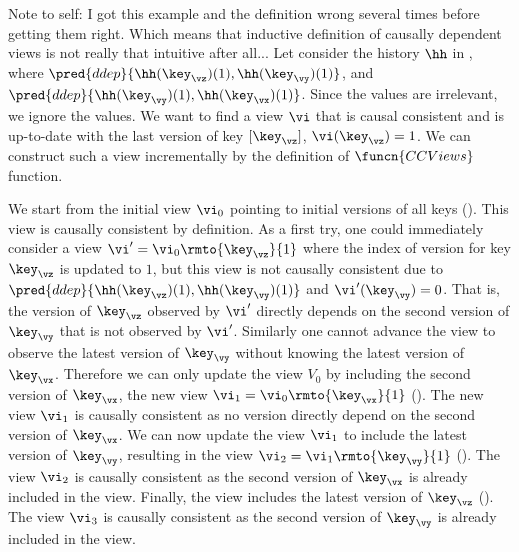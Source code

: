 \ac{Note to self: I got this example and the definition wrong several times before getting them
right. Which means that inductive definition of causally dependent views is not really that 
intuitive after all...}
Let consider the history $\hh$ in , where $\pred{ddep}{\hh(\key_\vz)(1),\hh(\key_{\vy})(1)}$, and $\pred{ddep}{\hh(\key_{\vy})(1) ,\hh(\key_{\vx})(1)}$.
Since the values are irrelevant, we ignore the values.
We want to find a view $\vi$ that is causal consistent and is up-to-date with the last version of key $[\key_{\vz}]$, \ie \( \vi(\key_\vz) = 1\).
We can construct such a view incrementally by the definition of \( \funcn{CCViews} \) function.

We start from the initial view $\vi_0$ pointing to initial versions of all keys ().
This view is causally consistent by definition.
As a first try, one could immediately consider a view $\vi'= \vi_0\rmto{\key_\vz}{1}$ where the index of version for key $\key_\vz$ is updated to $1$, but this view is not causally consistent due to \( \pred{ddep}{\hh(\key_\vz)(1),\hh(\key_{\vy})(1)} \) and \( \vi'(\key_\vy) = 0\).
That is, the version of $\key_\vz$ observed by $\vi'$ directly depends on the second version of $\key_\vy$ that is not observed by $\vi'$.
Similarly one cannot advance the view to observe the latest version of \( \key_\vy\) without knowing the latest version of \( \key_\vx\).
Therefore we can only update the view $V_0$ by including the second version of $\key_{\vx}$, \ie the new view \(\vi_1 = \vi_0\rmto{\key_\vx}{1} \) ().
The new view \( \vi_1\) is causally consistent as no version directly depend on the second version of \( \key_\vx\).
We can now update the view $\vi_1$ to include the latest version of $\key_{\vy}$, resulting in the view $\vi_2 = \vi_1\rmto{\key_{\vy}}{1}$ (). 
The view \( \vi_2\) is causally consistent as the second version of \( \key_\vx\) is already included in the view.
Finally, the view includes the latest version of \( \key_\vz \) ().
The view \( \vi_3\) is causally consistent as the second version of \( \key_\vy\) is already included in the view.


